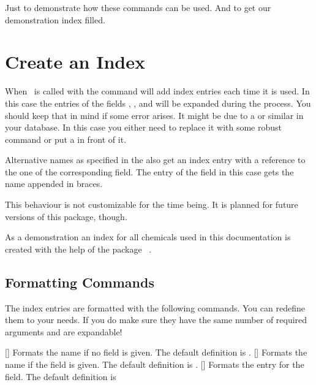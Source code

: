 \documentclass[load-preamble+]{cnltx-doc}
\begin{document}
\begin{example}
  Just to demonstrate how these commands can be used. And to get
  our demonstration index filled.\par
\end{example}

\section{Create an Index}\label{sec:index}
When \substances\ is called with  the command 
will add index entries each time it is used. In this case the entries of the
fields , ,  and  will be
expanded during the process. You should keep that in mind if some error
arises. It might be due to a  or similar in your database. In this
case you either need to replace it with some robust command or put a
 in front of it.

Alternative names as specified in the  also get an index entry
with a reference to the one of the corresponding  field. The
entry of the  field in this case gets the  name
appended in braces.

This behaviour is not customizable for the time being. It is planned for future
versions of this package, though.

As a demonstration an index for all chemicals used in this documentation is
created with the help of the package ~\cite{pkg:imakeidx}.

\subsection{Formatting Commands}
The index entries are formatted with the following commands. You can redefine
them to your needs. If you do make sure they have the same number of required
arguments and are expandable!
\begin{commands}
  \expandable{}[]
    Formats the name if no  field is given. The default definition
    is .
  \expandable{}[]
    Formats the name if the  field is given. The default definition is
    .
  \expandable{}[]
    Formats the entry for the  field.  The default definition is
\end{commands}
\end{document}
